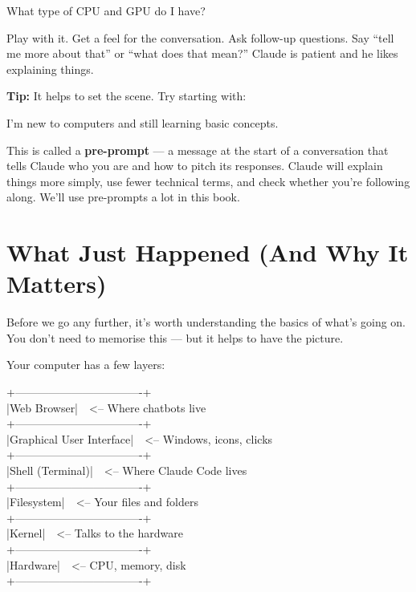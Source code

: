 \documentclass[11pt,a4paper]{article}
\begin{document}
\begin{tcolorbox}[promptbox]
What type of CPU and GPU do I have?
\end{tcolorbox}

Play with it. Get a feel for the conversation. Ask follow-up questions. Say ``tell me more about that'' or ``what does that mean?'' Claude is patient and he likes explaining things.

\textbf{Tip:} It helps to set the scene. Try starting with:

\begin{tcolorbox}[promptbox]
I'm new to computers and still learning basic concepts.
\end{tcolorbox}

This is called a \textbf{pre-prompt} --- a message at the start of a conversation that tells Claude who you are and how to pitch its responses. Claude will explain things more simply, use fewer technical terms, and check whether you're following along. We'll use pre-prompts a lot in this book.

\section{What Just Happened (And Why It Matters)}

Before we go any further, it's worth understanding the basics of what's going on. You don't need to memorise this --- but it helps to have the picture.

Your computer has a few layers:

\begin{tcolorbox}[termbox]
+----------------------------------+\\
|\quad\quad\quad Web Browser\quad\quad\quad\quad\quad\quad\quad\quad |~~<-- Where chatbots live\\
+----------------------------------+\\
|\quad\quad Graphical User Interface\quad\quad |~~<-- Windows, icons, clicks\\
+----------------------------------+\\
|\quad\quad\quad Shell (Terminal)\quad\quad\quad\quad\quad |~~<-- Where Claude Code lives\\
+----------------------------------+\\
|\quad\quad\quad\quad Filesystem\quad\quad\quad\quad\quad\quad\quad |~~<-- Your files and folders\\
+----------------------------------+\\
|\quad\quad\quad\quad\quad Kernel\quad\quad\quad\quad\quad\quad\quad\quad |~~<-- Talks to the hardware\\
+----------------------------------+\\
|\quad\quad\quad\quad\quad Hardware\quad\quad\quad\quad\quad\quad\quad |~~<-- CPU, memory, disk\\
+----------------------------------+
\end{tcolorbox}
\end{document}
